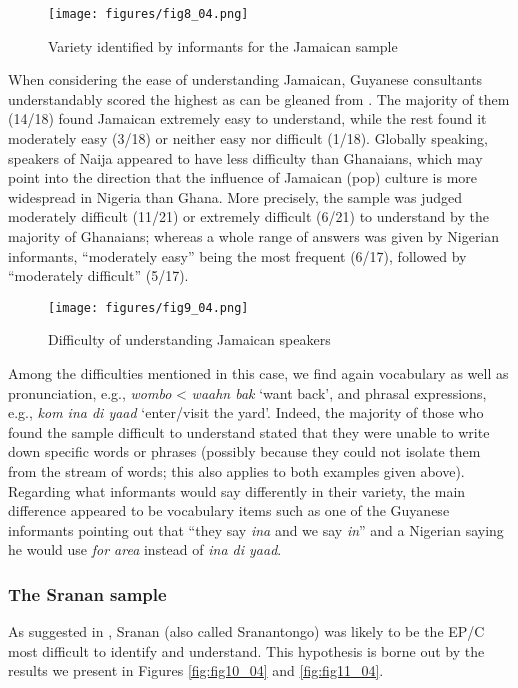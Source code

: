 \documentclass[output=paper,colorlinks,citecolor=brown]{langscibook}
\begin{document}
\begin{figure}
    \texttt{[image: figures/fig8\_04.png]}
    \caption{Variety identified by informants for the Jamaican sample}
    \label{fig:fig8_04}
\end{figure}

When considering the ease of understanding Jamaican, Guyanese consultants understandably scored the highest as can be gleaned from . The majority of them (14/18) found Jamaican extremely easy to understand, while the rest found it moderately easy (3/18) or neither easy nor difficult (1/18). Globally speaking, speakers of Naija appeared to have less difficulty than Ghanaians, which may point into the direction that the influence of Jamaican (pop) culture is more widespread in Nigeria than Ghana. More precisely, the sample was judged moderately difficult (11/21) or extremely difficult (6/21) to understand by the majority of Ghanaians; whereas a whole range of answers was given by Nigerian informants, “moderately easy” being the most frequent (6/17), followed by “moderately difficult” (5/17).

\begin{figure}
    \texttt{[image: figures/fig9\_04.png]}
    \caption{Difficulty of understanding Jamaican speakers}
    \label{fig:fig9_04}
\end{figure}

Among the difficulties mentioned in this case, we find again vocabulary as well as pronunciation, e.g., \emph{wombo} < \emph{waahn bak} ‘want back’, and phrasal expressions, e.g., \emph{kom ina di yaad} ‘enter/visit the yard’. Indeed, the majority of those who found the sample difficult to understand stated that they were unable to write down specific words or phrases (possibly because they could not isolate them from the stream of words; this also applies to both examples given above). Regarding what informants would say differently in their variety, the main difference appeared to be vocabulary items such as one of the Guyanese informants pointing out that “they say \emph{ina} and we say \emph{in}” and a Nigerian saying he would use \emph{for area} instead of \emph{ina di yaad}. 

\subsubsection{The Sranan sample}

As suggested in , Sranan (also called Sranantongo) was likely to be the EP/C most difficult to identify and understand. This hypothesis is borne out by the results we present in Figures \ref{fig:fig10_04} and \ref{fig:fig11_04}.
\end{document}

